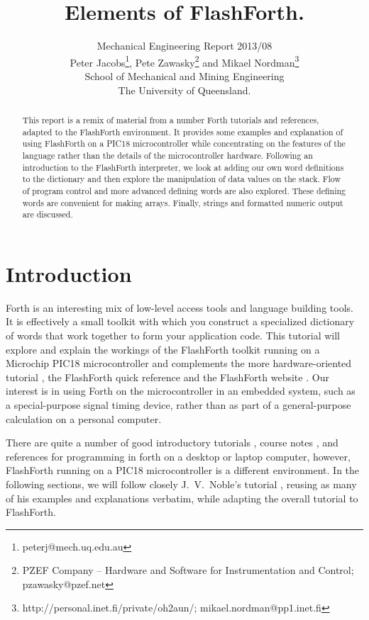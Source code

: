 \documentclass[12pt,a4paper]{article}
\title{
    Elements of FlashForth.
}
\author{
    Mechanical Engineering Report 2013/08\\
    Peter Jacobs\thanks{peterj@mech.uq.edu.au}, 
    Pete Zawasky\thanks{PZEF Company -- Hardware and Software for Instrumentation and Control; pzawasky@pzef.net} and 
    Mikael Nordman\thanks{http://personal.inet.fi/private/oh2aun/; mikael.nordman@pp1.inet.fi}\\
    School of Mechanical and Mining Engineering\\
    The University of Queensland.
}
\begin{document}
\maketitle

\begin{abstract}
This report is a remix of material from a number Forth tutorials and references, 
adapted to the FlashForth environment.
It provides some examples and explanation of using FlashForth on a PIC18 microcontroller
while concentrating on the features of the language rather than the details of the
microcontroller hardware.
Following an introduction to the FlashForth interpreter, 
we look at adding our own word definitions to the dictionary and then explore
the manipulation of data values on the stack.
Flow of program control and more advanced defining words are also explored.
These defining words are convenient for making arrays.
Finally, strings and formatted numeric output are discussed.
\end{abstract}

\bigskip
\tableofcontents

\cleardoublepage
\section{Introduction}
\label{sec:introduction}
%
Forth is an interesting mix of low-level access tools and language building tools.
It is effectively a small toolkit with which you construct a specialized dictionary of words
that work together to form your application code.
This tutorial will explore and explain the workings of the FlashForth toolkit
running on a Microchip PIC18 microcontroller
and complements the more hardware-oriented tutorial \cite{jacobs_2012b},
the FlashForth quick reference \cite{jacobs_2012c} and
the FlashForth website \cite{flashforth}.
Our interest is in using Forth on the microcontroller in an embedded system,
such as a special-purpose signal timing device,
rather than as part of a general-purpose calculation on a personal computer.

\medskip
There are quite a number of good introductory tutorials \cite{brodie_1987a,noble_2001a}, 
course notes \cite{pelc_2011a},
and references \cite{conklin_rather_2007a} 
for programming in forth on a desktop or laptop computer,
however, FlashForth running on a PIC18 microcontroller is a different environment.
In the following sections, we will follow closely J.~V.~Noble's tutorial \cite{noble_2001a},
reusing as many of his examples and explanations verbatim, 
while adapting the overall tutorial to FlashForth.
\end{document}
